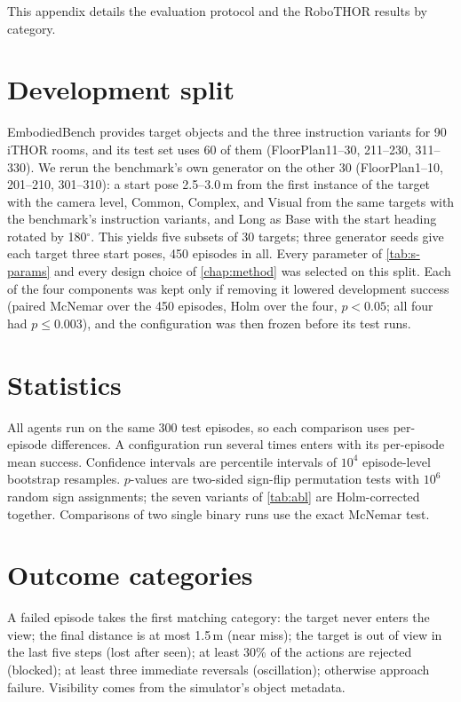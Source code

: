 \label{app:results}
This appendix details the evaluation protocol and the RoboTHOR results by category.

\section{Development split}
\label{sec:appB-dev}
EmbodiedBench provides target objects and the three instruction variants for 90 iTHOR rooms, and its test set uses
60 of them (FloorPlan11--30, 211--230, 311--330). We rerun the benchmark's own generator on the other 30
(FloorPlan1--10, 201--210, 301--310): a start pose 2.5--3.0\,m from the first instance of the target with the camera
level, Common, Complex, and Visual from the same targets with the benchmark's instruction variants, and Long as Base
with the start heading rotated by 180$^\circ$. This yields five subsets of 30 targets; three generator seeds give
each target three start poses, 450 episodes in all. Every parameter of \cref{tab:s-params} and every design choice of
\cref{chap:method} was selected on this split. Each of the four components was kept only if removing it lowered
development success (paired McNemar over the 450 episodes, Holm over the four, $p<0.05$; all four had $p\le0.003$),
and the configuration was then frozen before its test runs.

\section{Statistics}
All agents run on the same 300 test episodes, so each comparison uses per-episode differences. A configuration run
several times enters with its per-episode mean success. Confidence intervals are percentile intervals of $10^4$
episode-level bootstrap resamples. $p$-values are two-sided sign-flip permutation tests with $10^6$ random sign
assignments; the seven variants of \cref{tab:abl} are Holm-corrected together. Comparisons of two single
binary runs use the exact McNemar test.

\section{Outcome categories}
A failed episode takes the first matching category: the target never enters the view; the final distance is at most
1.5\,m (near miss); the target is out of view in the last five steps (lost after seen); at least 30\% of the actions
are rejected (blocked); at least three immediate reversals (oscillation); otherwise approach failure. Visibility
comes from the simulator's object metadata.

